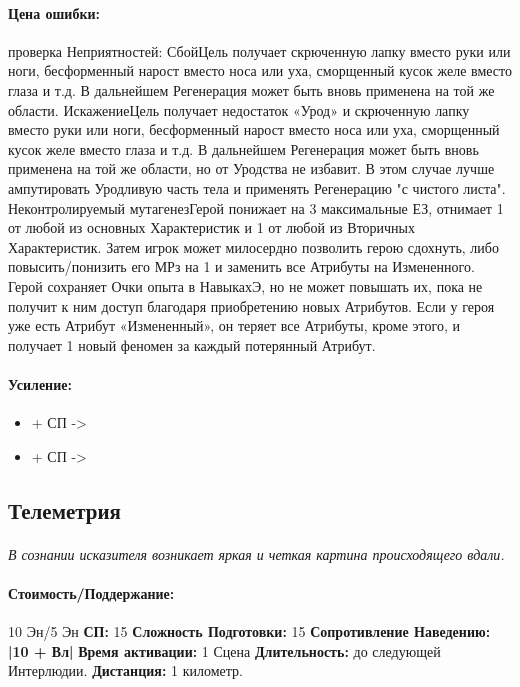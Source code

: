 \paragraph{Цена ошибки: }проверка Неприятностей: 
 {Сбой}{Цель получает скрюченную лапку вместо руки или ноги, бесформенный нарост вместо носа или уха, сморщенный кусок желе вместо глаза и т.д. 
\newline В дальнейшем Регенерация может быть вновь применена на той же области.} {Искажение}{Цель получает недостаток «Урод» и скрюченную лапку вместо руки или ноги, бесформенный нарост вместо носа или уха, сморщенный кусок желе вместо глаза и т.д. 
\newline В дальнейшем Регенерация может быть вновь применена на той же области, но от Уродства не избавит. В этом случае лучше ампутировать Уродливую часть тела и применять Регенерацию "с чистого листа".} {Неконтролируемый мутагенез}{Герой понижает на 3 максимальные ЕЗ, отнимает 1 от любой из основных Характеристик и 1 от любой из Вторичных Характеристик. Затем игрок может милосердно позволить герою сдохнуть, либо повысить/понизить его МРз на 1 и заменить все Атрибуты на Измененного. Герой сохраняет Очки опыта в НавыкахЭ, но не может повышать их, пока не получит к ним доступ благодаря приобретению новых Атрибутов. Если у героя уже есть Атрибут «Измененный», он теряет все Атрибуты, кроме этого, и получает 1 новый феномен за каждый потерянный Атрибут.}
\paragraph{Усиление:}
\begin{itemize}
\item+ СП -> 
\item+ СП -> 
\end{itemize}
\subsection{Телеметрия}
\paragraph{} 
\textit{В сознании исказителя возникает яркая и четкая картина происходящего вдали.}
\paragraph{Стоимость/Поддержание: }10 Эн/5 Эн
\leavevmode
\newline 
\textbf{СП: }15
\leavevmode
\newline 
\textbf{Сложность Подготовки: }15
\leavevmode
\newline 
\textbf{Сопротивление Наведению: }
\textbf{|10 + Вл|}
\leavevmode
\newline 
\textbf{Время активации: }1 Сцена
\leavevmode
\newline 
\textbf{Длительность: }до следующей Интерлюдии.
\leavevmode
\newline 
\textbf{Дистанция: }1 километр.
